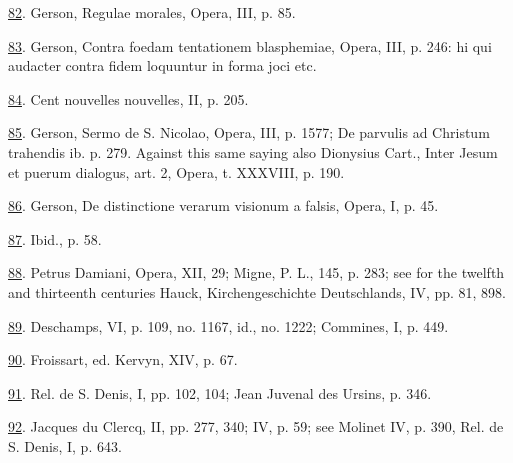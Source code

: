\protect\hypertarget{23_NOTES.xhtmlux5cux23id_1109}{\protect\hyperlink{13_Chapter_Six__THE_DEPICTION_OF_TH.xhtmlux5cux23id_1108}{82}}.
Gerson, Regulae morales, Opera, III, p. 85.

\protect\hypertarget{23_NOTES.xhtmlux5cux23id_1107}{\protect\hyperlink{13_Chapter_Six__THE_DEPICTION_OF_TH.xhtmlux5cux23id_1106}{83}}.
Gerson, Contra foedam tentationem blasphemiae, Opera, III, p. 246: hi
qui audacter contra fidem loquuntur in forma joci etc.

\protect\hypertarget{23_NOTES.xhtmlux5cux23id_1105}{\protect\hyperlink{13_Chapter_Six__THE_DEPICTION_OF_TH.xhtmlux5cux23id_1104}{84}}.
Cent nouvelles nouvelles, II, p. 205.

\protect\hypertarget{23_NOTES.xhtmlux5cux23id_1103}{\protect\hyperlink{13_Chapter_Six__THE_DEPICTION_OF_TH.xhtmlux5cux23id_1102}{85}}.
Gerson, Sermo de S. Nicolao, Opera, III, p. 1577; De parvulis ad
Christum trahendis ib. p. 279. Against this same saying also Dionysius
Cart., Inter Jesum et puerum dialogus, art. 2, Opera, t. XXXVIII, p.
190.

\protect\hypertarget{23_NOTES.xhtmlux5cux23id_1101}{\protect\hyperlink{13_Chapter_Six__THE_DEPICTION_OF_TH.xhtmlux5cux23id_1100}{86}}.
Gerson, De distinctione verarum visionum a falsis, Opera, I, p. 45.

\protect\hypertarget{23_NOTES.xhtmlux5cux23id_1099}{\protect\hyperlink{13_Chapter_Six__THE_DEPICTION_OF_TH.xhtmlux5cux23id_1098}{87}}.
Ibid., p. 58.

\protect\hypertarget{23_NOTES.xhtmlux5cux23id_1097}{\protect\hyperlink{13_Chapter_Six__THE_DEPICTION_OF_TH.xhtmlux5cux23id_1096}{88}}.
Petrus Damiani, Opera, XII, 29; Migne, P. L., 145, p. 283; see for the
twelfth and thirteenth centuries Hauck, Kirchengeschichte Deutschlands,
IV, pp. 81, 898.

\protect\hypertarget{23_NOTES.xhtmlux5cux23id_1095}{\protect\hyperlink{13_Chapter_Six__THE_DEPICTION_OF_TH.xhtmlux5cux23id_1094}{89}}.
Deschamps, VI, p. 109, no. 1167, id., no. 1222; Commines, I, p. 449.

\protect\hypertarget{23_NOTES.xhtmlux5cux23id_1093}{\protect\hyperlink{13_Chapter_Six__THE_DEPICTION_OF_TH.xhtmlux5cux23id_1092}{90}}.
Froissart, ed. Kervyn, XIV, p. 67.

\protect\hypertarget{23_NOTES.xhtmlux5cux23id_1091}{\protect\hyperlink{13_Chapter_Six__THE_DEPICTION_OF_TH.xhtmlux5cux23id_1090}{91}}.
Rel. de S. Denis, I, pp. 102, 104; Jean Juvenal des Ursins, p. 346.

\protect\hypertarget{23_NOTES.xhtmlux5cux23id_1089}{\protect\hyperlink{13_Chapter_Six__THE_DEPICTION_OF_TH.xhtmlux5cux23id_1088}{92}}.
Jacques du Clercq, II, pp. 277, 340; IV, p. 59; see Molinet IV, p. 390,
Rel. de S. Denis, I, p. 643.

